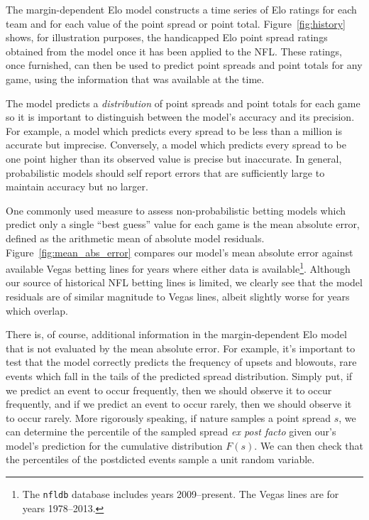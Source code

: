 \documentclass[aps,prc,reprint,amsmath,superscriptaddress,nofootinbib]{revtex4-1}
\begin{document}
The margin-dependent Elo model constructs a time series of Elo ratings for each team and for each value of the point spread or point total.
Figure~\ref{fig:history} shows, for illustration purposes, the handicapped Elo point spread ratings obtained from the model once it has been applied to the NFL.
These ratings, once furnished, can then be used to predict point spreads and point totals for any game, using the information that was available at the time.

The model predicts a \emph{distribution} of point spreads and point totals for each game so it is important to distinguish between the model's accuracy and its precision. 
For example, a model which predicts every spread to be less than a million is accurate but imprecise.
Conversely, a model which predicts every spread to be one point higher than its observed value is precise but inaccurate.
In general, probabilistic models should self report errors that are sufficiently large to maintain accuracy but no larger.

One commonly used measure to assess non-probabilistic betting models which predict only a single ``best guess'' value for each game is the mean absolute error, defined as the arithmetic mean of absolute model residuals.
Figure~\ref{fig:mean_abs_error} compares our model's mean absolute error against available Vegas betting lines for years where either data is available\footnote{The \texttt{nfldb} database includes years 2009--present. The Vegas lines are for years 1978--2013.}.
Although our source of historical NFL betting lines is limited, we clearly see that the model residuals are of similar magnitude to Vegas lines, albeit slightly worse for years which overlap.

There is, of course, additional information in the margin-dependent Elo model that is not evaluated by the mean absolute error.
For example, it's important to test that the model correctly predicts the frequency of upsets and blowouts, rare events which fall in the tails of the predicted spread distribution.
Simply put, if we predict an event to occur frequently, then we should observe it to occur frequently, and if we predict an event to occur rarely, then we should observe it to occur rarely. 
More rigorously speaking, if nature samples a point spread $s$, we can determine the percentile of the sampled spread \emph{ex post facto} given our's model's prediction for the cumulative distribution $F(s)$.
We can then check that the percentiles of the postdicted events sample a unit random variable.
\end{document}
